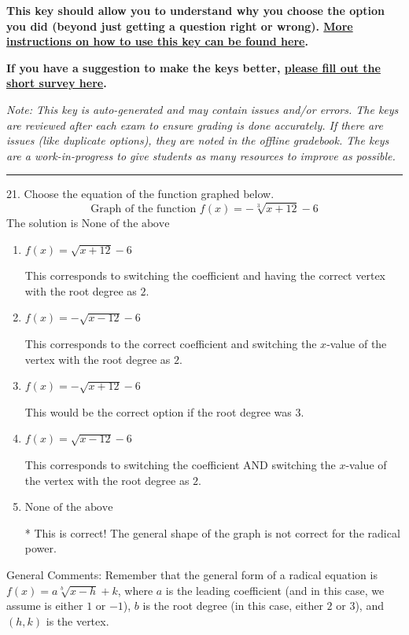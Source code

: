 \documentclass{extbook}[14pt]
\begin{document}
\textbf{This key should allow you to understand why you choose the option you did (beyond just getting a question right or wrong). \href{https://xronos.clas.ufl.edu/mac1105spring2020/courseDescriptionAndMisc/Exams/LearningFromResults}{More instructions on how to use this key can be found here}.}

\textbf{If you have a suggestion to make the keys better, \href{https://forms.gle/CZkbZmPbC9XALEE88}{please fill out the short survey here}.}

\textit{Note: This key is auto-generated and may contain issues and/or errors. The keys are reviewed after each exam to ensure grading is done accurately. If there are issues (like duplicate options), they are noted in the offline gradebook. The keys are a work-in-progress to give students as many resources to improve as possible.}

\rule{\textwidth}{0.4pt}

21. Choose the equation of the function graphed below.
\[ \text{Graph of the function } f(x) = - \sqrt[3]{x + 12} - 6 \] 
The solution is $ \text{None of the above} $ 

\begin{enumerate}[label=\Alph*.] 
\item $ f(x) = \sqrt{x + 12} - 6 $ 

 This corresponds to switching the coefficient and having the correct vertex with the root degree as $2$. 
\item $ f(x) = - \sqrt{x - 12} - 6 $ 

 This corresponds to the correct coefficient and switching the $x$-value of the vertex with the root degree as $2$. 
\item $ f(x) = - \sqrt{x + 12} - 6 $ 

 This would be the correct option if the root degree was $3$. 
\item $ f(x) = \sqrt{x - 12} - 6 $ 

 This corresponds to switching the coefficient AND switching the $x$-value of the vertex with the root degree as $2$. 
\item $ \text{None of the above} $ 

 * This is correct! The general shape of the graph is not correct for the radical power. 
\end{enumerate} 
 
General Comments: Remember that the general form of a radical equation is $ f(x) = a \sqrt[b]{x - h} + k$, where $a$ is the leading coefficient (and in this case, we assume is either $1$ or $-1$), $b$ is the root degree (in this case, either $2$ or $3$), and $(h, k)$ is the vertex.
\end{document}
